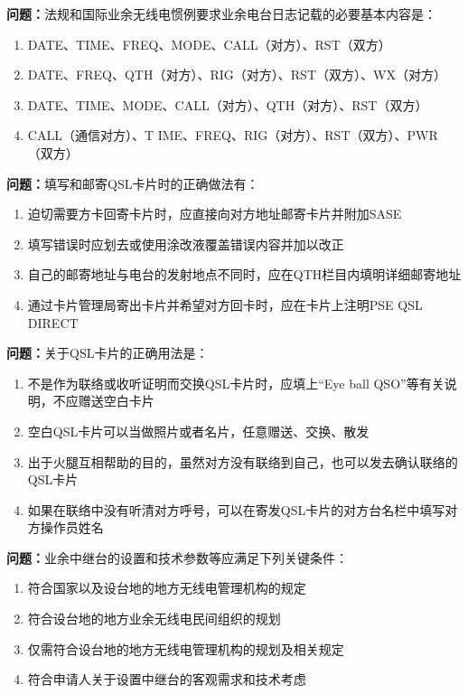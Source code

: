 \documentclass{ctexbook}
\begin{document}
\textbf{问题：}法规和国际业余无线电惯例要求业余电台日志记载的必要基本内容是：
\begin{enumerate}[label=\Alph*), leftmargin=3em]
\item DATE、TIME、FREQ、MODE、CALL（对方）、RST（双方）
\item DATE、FREQ、QTH（对方）、RIG（对方）、RST（双方）、WX（对方）
\item DATE、TIME、MODE、CALL（对方）、QTH（对方）、RST（双方）
\item CALL（通信对方）、T IME、FREQ、RIG（对方）、RST（双方）、PWR（双方）
\end{enumerate}

\textbf{问题：}填写和邮寄QSL卡片时的正确做法有：
\begin{enumerate}[label=\Alph*), leftmargin=3em]
\item 迫切需要方卡回寄卡片时，应直接向对方地址邮寄卡片并附加SASE
\item 填写错误时应划去或使用涂改液覆盖错误内容并加以改正
\item 自己的邮寄地址与电台的发射地点不同时，应在QTH栏目内填明详细邮寄地址
\item 通过卡片管理局寄出卡片并希望对方回卡时，应在卡片上注明PSE QSL DIRECT
\end{enumerate}

\textbf{问题：}关于QSL卡片的正确用法是：
\begin{enumerate}[label=\Alph*), leftmargin=3em]
\item 不是作为联络或收听证明而交换QSL卡片时，应填上“Eye ball QSO”等有关说明，不应赠送空白卡片
\item 空白QSL卡片可以当做照片或者名片，任意赠送、交换、散发
\item 出于火腿互相帮助的目的，虽然对方没有联络到自己，也可以发去确认联络的QSL卡片
\item 如果在联络中没有听清对方呼号，可以在寄发QSL卡片的对方台名栏中填写对方操作员姓名
\end{enumerate}

\textbf{问题：}业余中继台的设置和技术参数等应满足下列关键条件：
\begin{enumerate}[label=\Alph*), leftmargin=3em]
\item 符合国家以及设台地的地方无线电管理机构的规定
\item 符合设台地的地方业余无线电民间组织的规划
\item 仅需符合设台地的地方无线电管理机构的规划及相关规定
\item 符合申请人关于设置中继台的客观需求和技术考虑
\end{enumerate}
\end{document}
